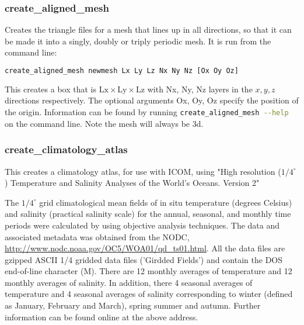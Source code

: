 
\subsubsection{create\_aligned\_mesh}
\label{sect:create_aligned_mesh}

Creates the triangle files for a mesh that lines up in all directions, so that it can be made it into a singly, doubly or triply periodic mesh. It is run from the command line:

\begin{lstlisting}[language = Bash]
create_aligned_mesh newmesh Lx Ly Lz Nx Ny Nz [Ox Oy Oz]
\end{lstlisting}

This creates a box that is $\mathrm{Lx} \times \mathrm{Ly} \times \mathrm{Lz}$ with Nx, Ny, Nz layers in the $x,y,z$ directions respectively. The optional arguments Ox, Oy, Oz  specify the position of the origin. Information can be found by running \lstinline[language = bash]+create_aligned_mesh --help+ on the command line. Note the mesh will always be 3d.


\subsubsection{create\_climatology\_atlas}
\label{sect:create_climatology_atlas}

This creates a climatology atlas, for use with ICOM, using "High resolution ($1/4 ^\circ$) Temperature and Salinity Analyses of the World's Oceans. Version 2"

The $1/4 ^\circ$ grid climatological mean fields of in situ temperature (degrees Celsius) and salinity (practical salinity scale) for the annual, seasonal, and monthly time periods were calculated by \cite{boyer2005} using objective analysis techniques. The data and associated metadata was obtained from the NODC, \url{http://www.nodc.noaa.gov/OC5/WOA01/qd_ts01.html}. All the data files are gzipped ASCII 1/4 gridded data files ('Girdded Fields') and contain the DOS end-of-line character (M). There are 12 monthly averages of temperature and 12 monthly averages of salinity. In addition, there 4 seasonal averages of temperature and 4 seasonal averages of salinity corresponding to winter (defined as January, February and March), spring summer and autumn. Further information can be found online at the above address.

